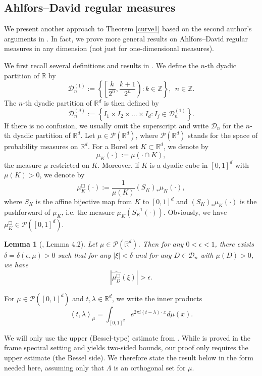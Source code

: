 \documentclass[12pt,a4paper,intlimits,sumlimits]{amsart}
\theoremstyle{plain}
\newtheorem{lemma}{Lemma}
\theoremstyle{definition}
\newcommand{\RR}{{\mathbb R}}
\newcommand{\ZZ}{{\mathbb Z}}
\newcounter{rem}
\begin{document}
\subsection{Ahlfors--David regular measures}\label{ss:shi}
 We present another approach to Theorem \ref{curve1} based on the second author's arguments in \cite{Shi21}. In fact, we prove more general results on Ahlfors--David regular measures in any dimension (not just for one-dimensional measures).  


 We first recall several definitions and results in \cite{Shi21}.  We define the $n$-th dyadic partition of $\mathbb{R}$ by
$$
\mathcal{D}_n^{(1)}:=\left\{ \left[ \frac{k}{2^n}, \frac{k+1}{2^n} \right): k\in \mathbb{Z}  \right\},\ \ n\in\ZZ.
$$
The $n$-th dyadic partition of $\mathbb{R}^d$ is then defined by
$$
\mathcal{D}_n^{(d)}:=\left\{ I_1\times I_2\times \dots \times I_d: I_j\in \mathcal{D}_n^{(1)}  \right\}.
$$
If there is no confusion, we usually omit the superscript and write $\mathcal{D}_n$ for the $n$-th dyadic partition of $\mathbb{R}^d$.
Let $\mu\in \mathcal{P}(\mathbb{R}^d)$, where $\mathcal{P}(\mathbb{R}^d)$ stands for the space of probability measures on $\RR^d$. For a Borel set $K\subset \mathbb{R}^d$, we denote by 
$$
\mu_{K}(\cdot):=\mu(\cdot\cap K),
$$
the measure $\mu$ restricted on $K$. Moreover, if $K$ is a dyadic cube in $[0,1]^d$ with $\mu(K)>0$, we denote by
$$
\mu_{K}^{\Box}(\cdot):=\frac{1}{\mu(K)}(S_K)_*\mu_{K}(\cdot),
$$
where $S_K$ is the affine bijective map from $K$ to $[0,1]^d$ and $(S_K)_*\mu_{K}(\cdot)$ is the pushforward of $\mu_K$, i.e. the measure $\mu_{K}(S_K^{-1}(\cdot))$. Obviously, we have $\mu_{K}^{\Box}\in \mathcal{P}([0,1]^d)$.

\begin{lemma}[\cite{Shi21}, Lemma 4.2]\label{lem:fourier transform}
	Let $\mu\in \mathcal{P}(\mathbb{R}^d)$. Then for any $0<\epsilon<1$, there exists $\delta=\delta(\epsilon, \mu)>0$ such that for any $|\xi|<\delta$ and for any $D\in \mathcal{D}_n$ with $\mu(D)>0$, we have
	$$
	\left| \widehat{\mu_{D}^{\Box}}(\xi)  \right|>\epsilon.
	$$
\end{lemma}
For $\mu\in \mathcal{P}([0,1]^d)$ and $t,\lambda\in \RR^d$, we write the inner products
$$
\left\langle t, \lambda \right\rangle_{\mu}=\int_{[0,1]^d} e^{2\pi i (t-\lambda) \cdot x} d\mu(x).
$$

 

 We will only use the upper (Bessel-type) estimate from \cite[Lemma 4.1]{Shi21}. While \cite[Lemma 4.1]{Shi21} is proved in the frame spectral setting and yields two-sided bounds, our proof only requires the upper estimate (the Bessel side). We therefore state the result below in the form needed here, assuming only that 
$\Lambda$ is an orthogonal set for $\mu$.
 
\end{document}
